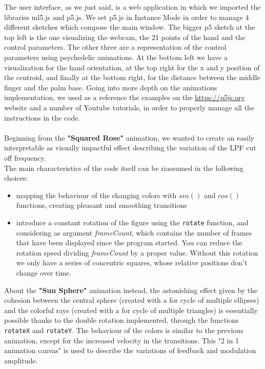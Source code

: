 \documentclass[a4paper,12pt]{report}
\begin{document}
The user interface, as we just said, is a web application in which we imported the libraries ml5.js and p5.js.  We set p5.js in Instance Mode in order to manage 4 different sketches which compose the main window. The bigger p5 sketch at the top left is the one visualizing the webcam, the 21 points of the hand and the control parameters. The other three are a representation of the control parameters using psychedelic animations. At the bottom left we have a visualization for the hand orientation, at the top right for the x and y position of the centroid, and finally at the bottom right, for the distance between the middle finger and the palm base. Going into more depth on the animations implementation, we used as a reference the examples on the \url{https://p5js.org}
website and a number of Youtube tutorials, in order to properly manage all the instructions in the code.\\
\\Beginning from the \textbf{"Squared Rose"} animation, we wanted to create an easily interpretable as visually impactful effect describing the variation of the LPF cut off frequency. \\The main characteristics of the code itself can be riassumed in the following choices:\begin{itemize}
\item mapping the behaviour of the changing colors with $sin()$ and $cos()$ functions, creating pleasant and smoothing transitions
\item introduce a constant rotation of the figure using the \texttt{rotate} function, and considering as argument \textit{frameCount}, which contains the number of frames that have been displayed since the program started. You can reduce the rotation speed dividing \textit{frameCount} by a proper value. Without this rotation we only have a series of concentric squares, whose relative positions don't change over time.
\end{itemize}
About the \textbf{"Sun Sphere"} animation instead, the astonishing effect given by the cohesion between the central sphere (created with a for cycle of multiple ellipses) and the colorful rays (created with a for cycle of multiple triangles) is essentially possible thanks to the double rotation implemented, through the functions \texttt{rotateX} and \texttt{rotateY}.
The behaviour of the colors is similar to the previous animation, except for the increased velocity in the transitions. This "2 in 1 animation canvas" is used to describe the variations of feedback and modulation amplitude.\\
\end{document}

